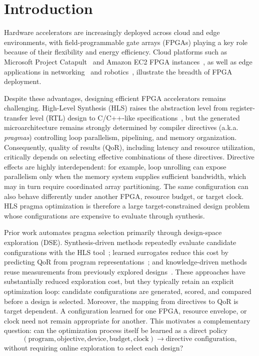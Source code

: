 \section{Introduction}

Hardware accelerators are increasingly deployed across cloud and edge environments, with field-programmable gate arrays (FPGAs) playing a key role because of their flexibility and energy efficiency. Cloud platforms such as Microsoft Project Catapult~\cite{putnam2014reconfigurable} and Amazon EC2 FPGA instances~\cite{amazon_f1_instance}, as well as edge applications in networking~\cite{chamola2020fpga} and robotics~\cite{wan2021survey}, illustrate the breadth of FPGA deployment.

Despite these advantages, designing efficient FPGA accelerators remains challenging. High-Level Synthesis (HLS) raises the abstraction level from register-transfer level (RTL) design to C/C++-like specifications~\cite{cong2011hls}, but the generated microarchitecture remains strongly determined by compiler directives (a.k.a. \textit{pragmas}) controlling loop parallelism, pipelining, and memory organization. Consequently, quality of results (QoR), including latency and resource utilization, critically depends on selecting effective combinations of these directives. Directive effects are highly interdependent: for example, loop unrolling can expose parallelism only when the memory system supplies sufficient bandwidth, which may in turn require coordinated array partitioning. The same configuration can also behave differently under another FPGA, resource budget, or target clock. HLS pragma optimization is therefore a large target-constrained design problem whose configurations are expensive to evaluate through synthesis.

Prior work automates pragma selection primarily through design-space exploration (DSE). Synthesis-driven methods repeatedly evaluate candidate
configurations with the HLS tool~\cite{mahapatra2014machine,
sengupta2015user,ferretti2018lattice,ferretti2018cluster, sohrabizadeh2020autodse}; learned surrogates reduce this cost by predicting QoR from program representations~\cite{dai2018fast,makrani2019xppe, lin2020hl,sohrabizadeh2022automated,sohrabizadeh2023harp}; and knowledge-driven methods reuse measurements from previously explored designs~\cite{ferretti2020leveraging,ferikoglou2024collectivehls}.
These approaches have substantially reduced exploration cost, but they typically retain an explicit optimization loop: candidate configurations are
generated, scored, and compared before a design is selected. Moreover, the
mapping from directives to QoR is target dependent. A configuration learned
for one FPGA, resource envelope, or clock need not remain appropriate for another. This motivates a complementary question: can the optimization process itself be learned as a direct policy
\[
(\text{program},\text{objective},\text{device},\text{budget},\text{clock})
\rightarrow \text{directive configuration},
\]
without requiring online exploration to select each design?


